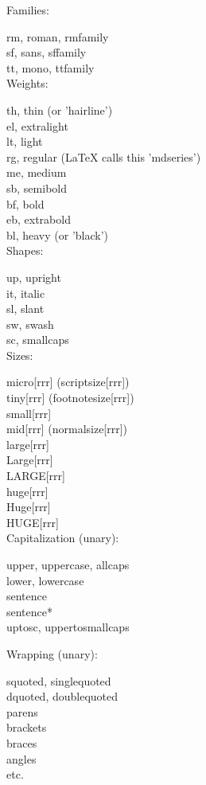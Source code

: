 Families:

rm, roman, rmfamily\\
sf, sans, sffamily\\
tt, mono, ttfamily\\

Weights:

th, thin (or 'hairline')\\
el, extralight\\
lt, light\\
rg, regular (LaTeX calls this 'mdseries')\\
me, medium\\
sb, semibold\\
bf, bold\\
eb, extrabold\\
bl, heavy (or 'black')\\

Shapes:

up, upright\\
it, italic\\
sl, slant\\
sw, swash\\
sc, smallcaps\\

Sizes:

micro[rrr] (scriptsize[rrr])\\
tiny[rrr] (footnotesize[rrr])\\
small[rrr]\\
mid[rrr] (normalsize[rrr])\\
large[rrr]\\
Large[rrr]\\
LARGE[rrr]\\
huge[rrr]\\
Huge[rrr]\\
HUGE[rrr]\\

Capitalization (unary):

upper, uppercase, allcaps\\
lower, lowercase\\
sentence\\
sentence*\\
uptosc, uppertosmallcaps


Wrapping (unary):

squoted, singlequoted\\
dquoted, doublequoted\\
parens\\
brackets\\
braces\\
angles\\
etc.\\

